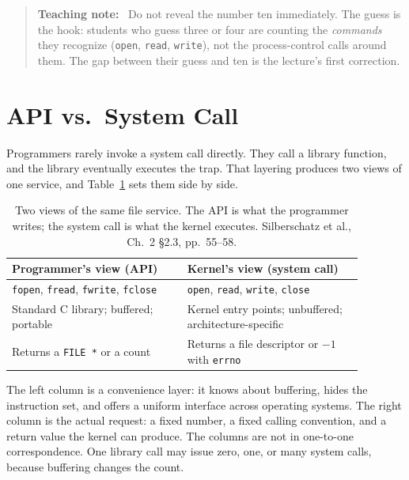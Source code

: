 \documentclass[11pt]{article}
\newenvironment{teachingaside}{\begin{quote}\small\color{primary-gold}\textbf{Teaching note:}\ }{\end{quote}}
\begin{document}
\begin{teachingaside}
Do not reveal the number ten immediately. The guess is the hook: students who guess three or four are counting the \emph{commands} they recognize (\texttt{open}, \texttt{read}, \texttt{write}), not the process-control calls around them. The gap between their guess and ten is the lecture's first correction.
\end{teachingaside}

\section{API vs.\ System Call}

Programmers rarely invoke a system call directly. They call a library function, and the library eventually executes the trap. That layering produces two views of one service, and Table~\ref{tab:two-views} sets them side by side.

\begin{table}[h]
\centering
\small
\renewcommand{\arraystretch}{1.3}
\begin{tabular}{@{}>{\raggedright\arraybackslash}p{0.44\linewidth}>{\raggedright\arraybackslash}p{0.44\linewidth}@{}}
\toprule
\textbf{Programmer's view (API)} & \textbf{Kernel's view (system call)} \\
\midrule
\texttt{fopen}, \texttt{fread}, \texttt{fwrite}, \texttt{fclose} &
\texttt{open}, \texttt{read}, \texttt{write}, \texttt{close} \\
Standard C library; buffered; portable &
Kernel entry points; unbuffered; architecture-specific \\
Returns a \texttt{FILE *} or a count &
Returns a file descriptor or $-1$ with \texttt{errno} \\
\bottomrule
\end{tabular}
\caption{Two views of the same file service. The API is what the programmer writes; the system call is what the kernel executes. Silberschatz et al., Ch.~2 \S2.3, pp.~55--58.}
\label{tab:two-views}
\end{table}

The left column is a convenience layer: it knows about buffering, hides the instruction set, and offers a uniform interface across operating systems. The right column is the actual request: a fixed number, a fixed calling convention, and a return value the kernel can produce. The columns are not in one-to-one correspondence. One library call may issue zero, one, or many system calls, because buffering changes the count.
\end{document}
